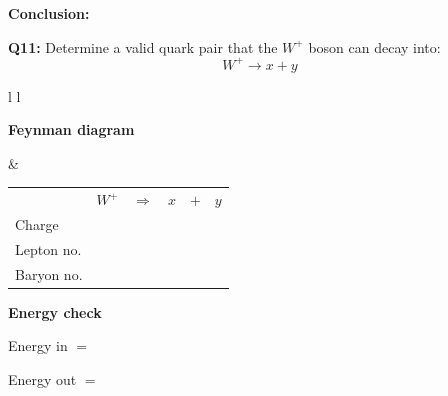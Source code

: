 \documentclass[12pt]{article}
\begin{document}
\vspace{0.5cm}

\textbf{Conclusion:}

\vspace{2.5cm}


\textbf{Q11:} Determine a valid quark pair that the $W^+$ boson can decay into:
\[
W^+ \rightarrow x + y
\]

\vspace{0.5cm}

\begin{tabular}{l l}

\begin{minipage}[t]{0.46\textwidth}
\vspace{0pt}
\textbf{Feynman diagram}

\vspace{0.6cm}

\begin{tikzpicture}
\begin{feynman}
  \vertex (W) at (0,2) {};
  \vertex [coordinate] (v) at (3,2) {};

  \vertex (x) at (4,4) {\(x\)};
  \vertex (y) at (5,3) {\(y\)};

  \diagram*{
    (W) -- [boson, edge label=\(W^+\), momentum'={}] (v),
    (v) -- [fermion] (x),
    (v) -- [fermion] (y),
  };
\end{feynman}
\end{tikzpicture}
\end{minipage}
&
\begin{minipage}[t]{0.50\textwidth}
\vspace{0pt}

\renewcommand{\arraystretch}{1.4}
\begin{tabular}{@{}l c c c c c@{}}
 & \(W^+\) & \(\Rightarrow\) & \(x\) & \(+\) & \(y\) \\
Charge &  &  &  &  &  \\
Lepton no. &  &  &  &  &  \\
Baryon no. &  &  &  &  &  \\
\end{tabular}

\vspace{0.6cm}

\textbf{Energy check}

Energy in $=$

Energy out $=$

\end{minipage}

\end{tabular}
\end{document}
